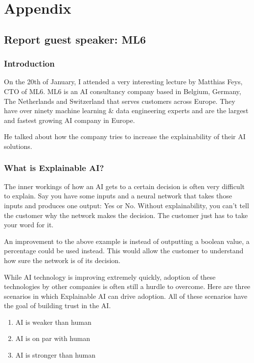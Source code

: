 \documentclass{article}
\begin{document}
\newpage
\section{Appendix}

\subsection{Report guest speaker: ML6}

\subsubsection{Introduction}

On the 20th of January, I attended a very interesting lecture by Matthias Feys, 
CTO of ML6. ML6 is an AI consultancy company based in Belgium, Germany, The Netherlands 
and Switzerland that serves customers across Europe. They have over ninety 
machine learning \& data engineering experts and are the largest and fastest 
growing AI company in Europe. 

He talked about how the company tries to increase the explainability of their AI 
solutions. 

\subsubsection{What is Explainable AI?}

The inner workings of how an AI gets to a certain decision is often very difficult to explain.
Say you have some inputs and a neural network that takes those inputs and produces
one output: Yes or No. Without explainability, you can't tell the customer why the 
network makes the decision. The customer just has to take your word for it.

An improvement to the above example is instead of outputting a boolean value, 
a percentage could be used instead. This would allow the customer to understand
how sure the network is of its decision.

While AI technology is improving extremely quickly, adoption of these technologies
by other companies is often still a hurdle to overcome. Here are three scenarios in 
which Explainable AI can drive adoption. All of these scenarios have the goal of
building trust in the AI.

\begin{enumerate}
    \item AI is weaker than human
    \item AI is on par with human
    \item AI is stronger than human
\end{enumerate}
\end{document}

